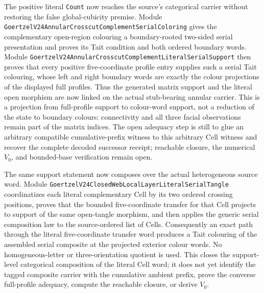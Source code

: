 \documentclass[11pt]{article}
\theoremstyle{definition}
\begin{document}
The positive literal \texttt{Count} now reaches the source's categorical
carrier without restoring the false global-cubicity premise.  Module
\texttt{GoertzelV24AnnularCrosscutComplementSerialColoring} gives the
complementary open-region colouring a boundary-rooted two-sided serial
presentation and proves its Tait condition and both ordered boundary words.
Module
\texttt{GoertzelV24AnnularCrosscutComplementLiteralSerialSupport} then proves
that every positive five-coordinate profile entry supplies such a serial Tait
colouring, whose left and right boundary words are exactly the colour
projections of the displayed full profiles.  Thus the generated matrix support
and the literal open morphism are now linked on the actual stub-bearing annular
carrier.  This is a projection from full-profile support to colour-word support,
not a reduction of the state to boundary colours: connectivity and all three
facial observations remain part of the matrix indices.  The open adequacy step
is still to glue an arbitrary compatible cumulative-prefix witness to this
arbitrary Cell witness and recover the complete decoded successor receipt;
reachable closure, the numerical $V_0$, and bounded-base verification remain
open.

The same support statement now composes over the actual heterogeneous source
word.  Module
\texttt{GoertzelV24ClosedWebLocalLayerLiteralSerialTangle} coordinatizes each
literal complementary Cell by its two ordered crossing positions, proves that
the bounded five-coordinate transfer for that Cell projects to support of the
same open-tangle morphism, and then applies the generic serial composition
law to the source-ordered list of Cells.  Consequently an exact path through
the literal five-coordinate transfer word produces a Tait colouring of the
assembled serial composite at the projected exterior colour words.  No
homogeneous-letter or three-orientation quotient is used.  This closes the
support-level categorical composition of the literal Cell word; it does not
yet identify the tagged composite carrier with the cumulative ambient prefix,
prove the converse full-profile adequacy, compute the reachable closure, or
derive $V_0$.
\end{document}
